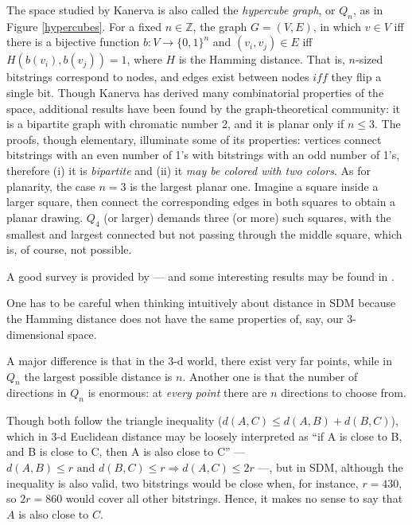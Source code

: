 The space studied by Kanerva is also called the \emph{hypercube graph}, or $Q_n$, as in Figure \ref{hypercubes}. For a fixed $n \in \mathbb{Z}$, the graph $G = (V, E)$, in which $v \in V$ iff there is a bijective function $b: V\to \{0,1\}^n$ and $(v_i, v_j) \in E$ iff $H(b(v_i), b(v_j))=1$, where $H$ is the Hamming distance. That is, $n$-sized bitstrings correspond to nodes, and edges exist between nodes $iff$ they flip a single bit.  Though Kanerva has derived many combinatorial properties of the space, additional results have been found by the graph-theoretical community: it is a bipartite graph with chromatic number 2, and it is planar only if $n\le3$. The proofs, though elementary, illuminate some of its properties:  vertices connect bitstrings with an even number of 1's with bitstrings with an odd number of 1's, therefore (i) it is \emph{bipartite} and (ii) it \emph{may be colored with two colors}.  As for planarity, the case $n=3$ is the largest planar one.  Imagine a square inside a larger square, then connect the corresponding edges in both squares to obtain a planar drawing.  $Q_4$ (or larger) demands three (or more) such squares, with the smallest and largest connected but not passing through the middle square, which is, of course, not possible.  

A good survey is provided by \citet{harary1988survey} --- and some interesting results may be found in \citep{foldes_characterization_1977, wagner_embedding_1990, laborde_another_1982, ruskey_combinatorial_2003}.

One has to be careful when thinking intuitively about distance in SDM because the Hamming distance does not have the same properties of, say, our 3-dimensional space.

A major difference is that in the 3-d world, there exist very far points, while in $Q_n$ the largest possible distance is $n$.  Another one is that the number of directions in $Q_n$ is enormous:  at \emph{every point} there are $n$ directions to choose from.

Though both follow the triangle inequality ($d(A, C) \le d(A, B) + d(B, C)$), which in 3-d Euclidean distance may be loosely interpreted as ``if A is close to B, and B is close to C, then A is also close to C'' --- $d(A, B) \le r \text{ and } d(B, C) \le r \Rightarrow d(A, C) \le 2r$ ---, but in SDM, although the inequality is also valid, two bitstrings would be close when, for instance, $r = 430$, so $2r = 860$ would cover all other bitstrings. Hence, it makes no sense to say that $A$ is also close to $C$.

